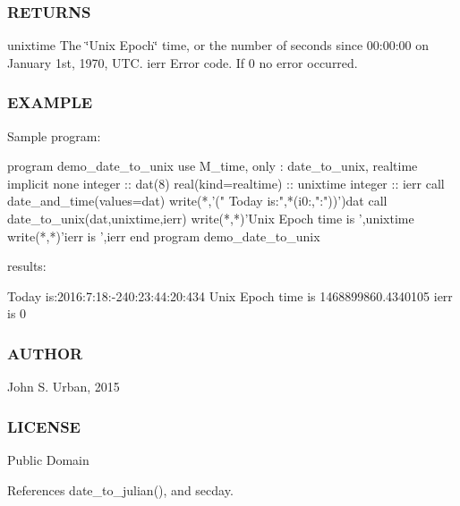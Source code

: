  \subsubsection*{R\+E\+T\+U\+R\+NS}

unixtime The \char`\"{}\+Unix Epoch\char`\"{} time, or the number of seconds since 00\+:00\+:00 on January 1st, 1970, U\+TC. ierr Error code. If 0 no error occurred.

\subsubsection*{E\+X\+A\+M\+P\+LE}

\begin{DoxyVerb} Sample program:

  program demo_date_to_unix
  use M_time, only : date_to_unix, realtime
  implicit none
  integer             :: dat(8)
  real(kind=realtime) :: unixtime
  integer             :: ierr
     call date_and_time(values=dat)
     write(*,'(" Today is:",*(i0:,":"))')dat
     call date_to_unix(dat,unixtime,ierr)
     write(*,*)'Unix Epoch time is ',unixtime
     write(*,*)'ierr is ',ierr
  end program demo_date_to_unix

 results:

  Today is:2016:7:18:-240:23:44:20:434
  Unix Epoch time is    1468899860.4340105
  ierr is            0
\end{DoxyVerb}
 \subsubsection*{A\+U\+T\+H\+OR}

John S. Urban, 2015 \subsubsection*{L\+I\+C\+E\+N\+SE}

Public Domain 

References date\+\_\+to\+\_\+julian(), and secday.

